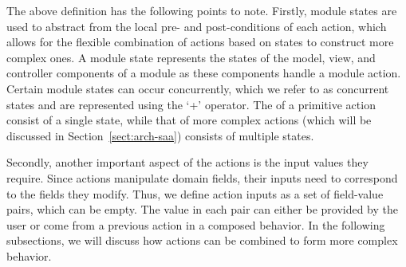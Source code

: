The above definition has the following points to note. Firstly, module states are used to abstract from the local pre- and post-conditions of each action, which allows for the flexible combination of actions based on states to construct more complex ones. A module state represents the states of the model, view, and controller components of a module as these components handle a module action. Certain module states can occur concurrently, which we refer to as concurrent states and are represented using the `+' operator. The  of a primitive action consist of a single state, while that of more complex actions (which will be discussed in Section~\ref{sect:arch-saa}) consists of multiple states.

Secondly, another important aspect of the actions is the input values they require. Since actions manipulate domain fields, their inputs need to correspond to the fields they modify. Thus, we define action inputs as a set of field-value pairs, which can be empty. The value in each pair can either be provided by the user or come from a previous action in a composed behavior. In the following subsections, we will discuss how actions can be combined to form more complex behavior.

